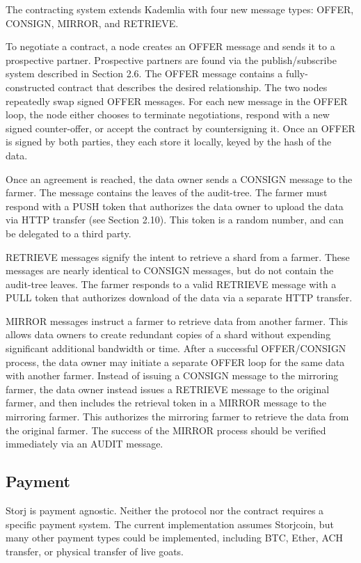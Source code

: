 \documentclass[a4paper,10pt]{article}
\begin{document}
The contracting system extends Kademlia with four new message types: OFFER, CONSIGN, MIRROR, and RETRIEVE.

To negotiate a contract, a node creates an OFFER message and sends it to a prospective partner. Prospective partners are found via the publish/subscribe system described in Section 2.6. The OFFER message contains a fully-constructed contract that describes the desired relationship. The two nodes repeatedly swap signed OFFER messages. For each new message in the OFFER loop, the node either chooses to terminate negotiations, respond with a new signed counter-offer, or accept the contract by countersigning it. Once an OFFER is signed by both parties, they each store it locally, keyed by the hash of the data.

Once an agreement is reached, the data owner sends a CONSIGN message to the farmer. The message contains the leaves of the audit-tree. The farmer must respond with a PUSH token that authorizes the data owner to upload the data via HTTP transfer (see Section 2.10). This token is a random number, and can be delegated to a third party.

RETRIEVE messages signify the intent to retrieve a shard from a farmer. These messages are nearly identical to CONSIGN messages, but do not contain the audit-tree leaves. The farmer responds to a valid RETRIEVE message with a PULL token that authorizes download of the data via a separate HTTP transfer.

MIRROR messages instruct a farmer to retrieve data from another farmer. This allows data owners to create redundant copies of a shard without expending significant additional bandwidth or time. After a successful OFFER/CONSIGN process, the data owner may initiate a separate OFFER loop for the same data with another farmer. Instead of issuing a CONSIGN message to the mirroring farmer, the data owner instead issues a RETRIEVE message to the original farmer, and then includes the retrieval token in a MIRROR message to the mirroring farmer. This authorizes the mirroring farmer to retrieve the data from the original farmer. The success of the MIRROR process should be verified immediately via an AUDIT message.

\subsection{Payment}
Storj is payment agnostic. Neither the protocol nor the contract requires a specific payment system. The current implementation assumes Storjcoin, but many other payment types could be implemented, including BTC, Ether, ACH transfer, or physical transfer of live goats.
\end{document}
